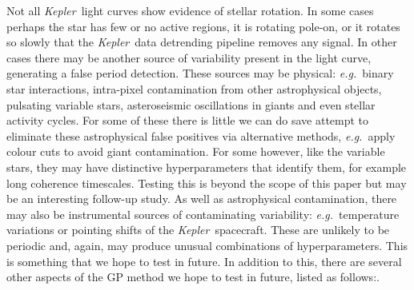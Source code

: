 \documentclass[useAMS, usenatbib, preprint, 12pt]{aastex}
\newcommand{\Kepler}{{\it Kepler}}
\newcommand{\kepler}{\Kepler}
\newcommand{\eg}{{\it e.g.}}
\begin{document}
Not all \kepler\ light curves show evidence of stellar rotation.
In some cases perhaps the star has few or no active regions, it is rotating
pole-on, or it rotates so slowly that the \kepler\ data detrending pipeline
removes any signal.
In other cases there may be another source of variability present in the light
curve, generating a false period detection.
These sources may be physical: \eg\ binary star interactions, intra-pixel
contamination from other astrophysical objects, pulsating variable stars,
asteroseismic oscillations in giants and even stellar activity cycles.
For some of these there is little we can do save attempt to eliminate these
astrophysical false positives via alternative methods, \eg\ apply colour cuts
to avoid giant contamination.
For some however, like the variable stars, they may have distinctive
hyperparameters that identify them, for example long coherence timescales.
Testing this is beyond the scope of this paper but may be an interesting
follow-up study.
As well as astrophysical contamination, there may also be instrumental sources
of contaminating variability: \eg\ temperature variations or pointing shifts
of the \kepler\ spacecraft.
These are unlikely to be periodic and, again, may produce unusual combinations
of hyperparameters.
This is something that we hope to test in future.
In addition to this, there are several other aspects of the GP method we hope
to test in future, listed as follows:.
\end{document}
